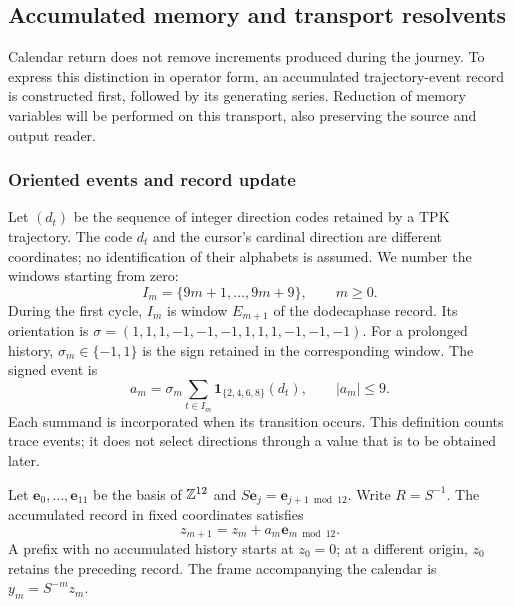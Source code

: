 \subsection{Accumulated memory and transport resolvents}
\label{subsec:memoria-resolvente}

Calendar return does not remove increments produced during the journey.
To express this distinction in operator form, an accumulated trajectory-event
record is constructed first, followed by its generating series. Reduction
of memory variables will be performed on this transport, also preserving
the source and output reader.

\subsubsection{Oriented events and record update}

Let \((d_t)\) be the sequence of integer direction codes retained by
a TPK trajectory. The code \(d_t\) and the cursor's cardinal direction
are different coordinates; no identification of their alphabets is assumed.
We number the windows starting from zero:
\[
 I_m=\{9m+1,\ldots,9m+9\},\qquad m\geq0.
\]
During the first cycle, \(I_m\) is window \(E_{m+1}\) of the
dodecaphase record. Its orientation is
\(\sigma=(1,1,1,-1,-1,-1,1,1,1,-1,-1,-1)\).
For a prolonged history, \(\sigma_m\in\{-1,1\}\) is the sign
retained in the corresponding window. The signed event is
\begin{equation}
 a_m=\sigma_m\sum_{t\in I_m}
       \mathbf1_{\{2,4,6,8\}}(d_t),\qquad |a_m|\leq9.
 \label{mem:evento}
\end{equation}
Each summand is incorporated when its transition occurs. This definition
counts trace events; it does not select directions through a value
that is to be obtained later.

Let \(\mathbf e_0,\ldots,\mathbf e_{11}\) be the basis of \(\mathbb Z^{12}\)
and \(S\mathbf e_j=\mathbf e_{j+1\bmod12}\). Write
\(R=S^{-1}\). The accumulated record in fixed coordinates satisfies
\[
z_{m+1}=z_m+a_m\mathbf e_{m\bmod12}.
\]
A prefix with no accumulated history starts at \(z_0=0\); at a different
origin, \(z_0\) retains the preceding record.
The frame accompanying the calendar is \(y_m=S^{-m}z_m\).

